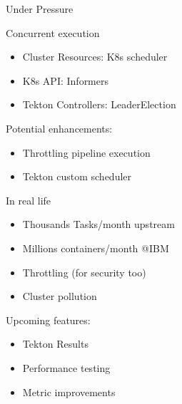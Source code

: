 \documentclass[aspectratio=169,11pt,hyperref={colorlinks=true}]{beamer}
\begin{document}
\begin{2columnsframe}%
  {%
    Under Pressure%
  }%
  {%
  Concurrent execution
  \begin{itemize}
    \item Cluster Resources: K8s scheduler
    \item K8s API: Informers
    \item Tekton Controllers: LeaderElection
  \end{itemize}
  \vspace{0.17\textheight}
  Potential enhancements:
  \begin{itemize}
    \item Throttling pipeline execution
    \item Tekton custom scheduler
  \end{itemize}
  }%
  {%
  In real life
  \begin{itemize}
    \item Thousands Tasks/month upstream
    \item Millions containers/month @IBM
    \item Throttling (for security too)
    \item Cluster pollution
  \end{itemize}
  \vspace{0.1\textheight}
  Upcoming features:
  \begin{itemize}
    \item Tekton Results
    \item Performance testing
    \item Metric improvements
  \end{itemize}
  }
\end{2columnsframe}
\end{document}
